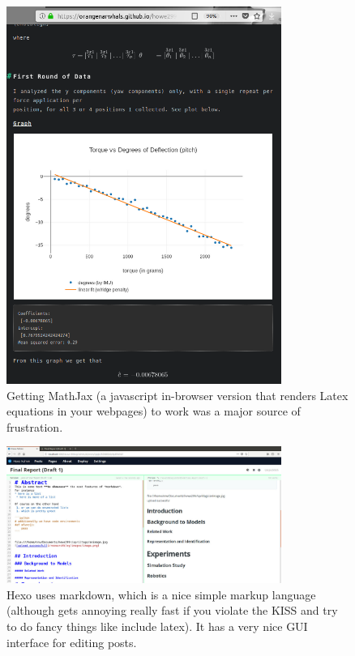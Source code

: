\documentclass[preprint,12pt,3p]{elsarticle}
\begin{document}
\begin{figure}[H]
\centering
\includegraphics[width=0.8\textwidth]{images/misc/blog_latex.png}
\caption{Getting MathJax (a javascript in-browser version that renders Latex
equations in your webpages) to work was a major source of frustration.}
\end{figure}




\begin{figure}[H]
\centering
\includegraphics[width=0.8\textwidth]{images/misc/hexo_editor.jpg}
\caption{Hexo uses markdown, which is a nice simple markup language (although gets annoying really fast if you violate the KISS and try to do fancy things like include latex). It has a very nice GUI interface for editing posts. }
\end{figure}
\end{document}
